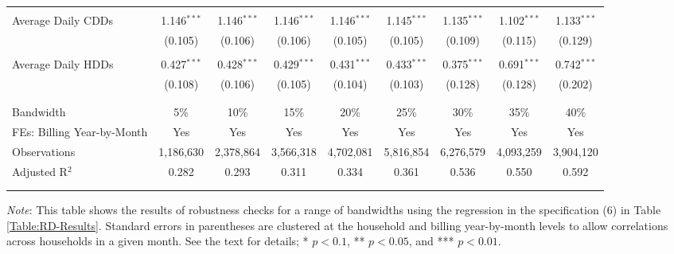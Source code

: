 {\begin{table}[t!]
\begin{adjustbox}{scale = 0.79}
\begin{threeparttable}
\begin{tabular}{@{\extracolsep{3pt}}lcccccccc}
                    & & & & & & & & \\ 
                    Average Daily CDDs & 1.146$^{***}$ & 1.146$^{***}$ & 1.146$^{***}$ & 1.146$^{***}$ & 1.145$^{***}$ & 1.135$^{***}$ & 1.102$^{***}$ & 1.133$^{***}$ \\ 
                    & (0.105) & (0.106) & (0.106) & (0.105) & (0.105) & (0.109) & (0.115) & (0.129) \\ 
                    & & & & & & & & \\ 
                    Average Daily HDDs & 0.427$^{***}$ & 0.428$^{***}$ & 0.429$^{***}$ & 0.431$^{***}$ & 0.433$^{***}$ & 0.375$^{***}$ & 0.691$^{***}$ & 0.742$^{***}$ \\ 
                    & (0.108) & (0.106) & (0.105) & (0.104) & (0.103) & (0.128) & (0.128) & (0.202) \\ 
                    & & & & & & & & \\
                    \hline
                    \\[-2.0ex]
                    Bandwidth & 5\% & 10\% & 15\% & 20\% & 25\% & 30\% & 35\% & 40\% \\ 
                    FEs: Billing Year-by-Month & Yes & Yes & Yes & Yes & Yes & Yes & Yes & Yes \\ 
                    Observations & 1,186,630 & 2,378,864 & 3,566,318 & 4,702,081 & 5,816,854 & 6,276,579 & 4,093,259 & 3,904,120 \\ 
                    Adjusted R$^{2}$ & 0.282 & 0.293 & 0.311 & 0.334 & 0.361 & 0.536 & 0.550 & 0.592 \\
                    \\[-2.0ex]
                    \hline \hline
                    \\[-4.5ex]
                \end{tabular}
                \begin{tablenotes}[flushleft]
                    \footnotesize
                    \item \textit{Note}: This table shows the results of robustness checks for a range of bandwidths using the regression in the specification (6) in Table \ref{Table:RD-Results}. Standard errors in parentheses are clustered at the household and billing year-by-month levels to allow correlations across households in a given month. See the text for details; * $p < 0.1$, ** $p < 0.05$, and *** $p < 0.01$.
                \end{tablenotes}
            \end{threeparttable}
        \end{adjustbox}
    \end{table}
}
